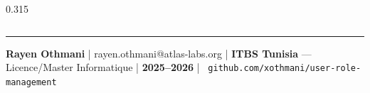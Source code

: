 \documentclass[final]{beamer}
\begin{document}
\begin{frame}[t]{}
\begin{columns}[t]
\begin{column}{0.315\linewidth}
\end{column}

\end{columns}

\vspace{0.4cm}
\noindent\textcolor{navy!30}{\rule{\linewidth}{1.4pt}}
\vspace{0.2cm}
\begin{center}
  \small\color{gray}
  \textbf{Rayen Othmani} \quad|\quad
  rayen.othmani@atlas-labs.org \quad|\quad
  \textbf{ITBS Tunisia} — Licence/Master Informatique \quad|\quad
  \textbf{2025–2026} \quad|\quad
  \faGithub~\texttt{github.com/xothmani/user-role-management}
\end{center}

\end{frame}
\end{document}
